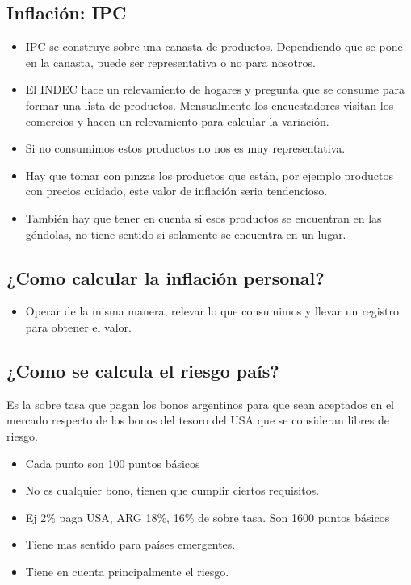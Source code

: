 \documentclass[titlepage,a4paper]{article}
\begin{document}
\newpage
\subsection{Inflación: IPC}

\begin{itemize}
\item IPC se construye sobre una canasta de productos. Dependiendo que se pone en la canasta, puede ser representativa o no para nosotros.
\item El INDEC hace un relevamiento de hogares y pregunta que se consume para formar una lista de productos. Mensualmente los encuestadores visitan los comercios y hacen un relevamiento para calcular la variación.
\item Si no consumimos estos productos no nos es muy representativa.
\item Hay que tomar con pinzas los productos que están, por ejemplo productos con precios cuidado, este valor de inflación seria tendencioso.
\item También hay que tener en cuenta si esos productos se encuentran en las góndolas, no tiene sentido si solamente se encuentra en un lugar.
\end{itemize}


\subsection{¿Como calcular la inflación personal?}

\begin{itemize}
\item Operar de la misma manera, relevar lo que consumimos y llevar un registro para obtener el valor.
\end{itemize}

\subsection{¿Como se calcula el riesgo país?}
Es la sobre tasa que pagan los bonos argentinos para que sean aceptados en el mercado respecto de los bonos del tesoro del USA que se consideran libres de riesgo.

\begin{itemize}
\item Cada punto son 100 puntos básicos
\item No es cualquier bono, tienen que cumplir ciertos requisitos.
\item Ej 2\% paga USA, ARG 18\%, 16\% de sobre tasa. Son 1600 puntos básicos
\item Tiene mas sentido para países emergentes.
\item Tiene en cuenta principalmente el riesgo.
\end{itemize}
\end{document}
